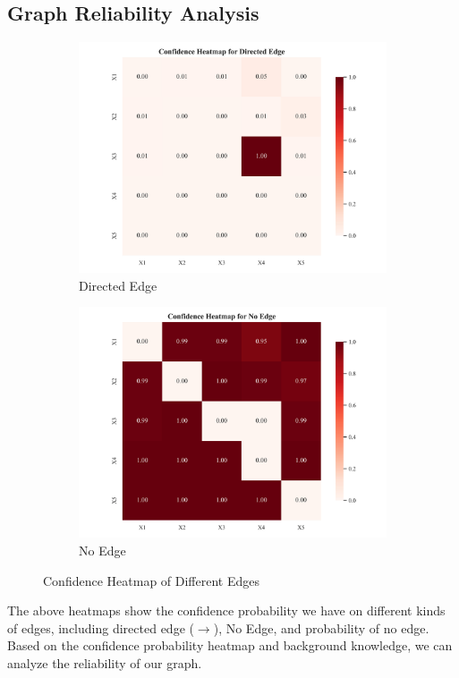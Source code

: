 \documentclass{article}
\begin{document}
\subsection{Graph Reliability Analysis}

\begin{figure}[H]
    \centering
    \begin{subfigure}{0.49\textwidth}
        \centering
        \includegraphics[width=\linewidth]{./demo_data/20241104_155654/Linear_Nongaussian_data/output_graph/certain_edges_confidence_heatmap.jpg}
        \caption{Directed Edge}
    \end{subfigure}
    \begin{subfigure}{0.49\textwidth}
        \centering
        \includegraphics[width=\linewidth]{./demo_data/20241104_155654/Linear_Nongaussian_data/output_graph/non_existence_confidence_heatmap.jpg}
        \caption{No Edge}
    \end{subfigure}
    \caption{Confidence Heatmap of Different Edges}
\end{figure}        
The above heatmaps show the confidence probability we have on different kinds of edges, including directed edge ($\rightarrow$), No Edge, and probability of no edge. Based on the confidence probability heatmap and background knowledge, we can analyze the reliability of our graph.
\end{document}
